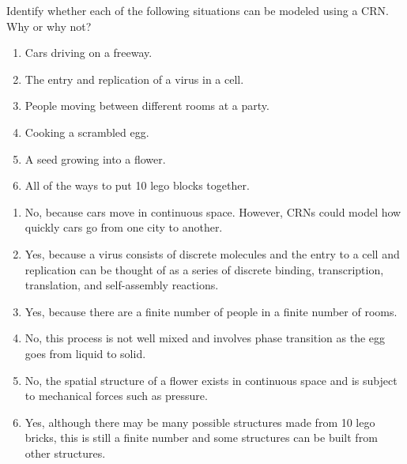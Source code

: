 \begin{popquiz}[label=pq:crn:modelling]
  Identify whether each of the following situations can be modeled using a CRN. Why or why not?
  \begin{enumerate}
    \item Cars driving on a freeway. 
    \item The entry and replication of a virus in a cell.
    \item People moving between different rooms at a party.
    \item Cooking a scrambled egg. 
    \item A seed growing into a flower. 
    \item All of the ways to put 10 lego blocks together. 
  \end{enumerate}
\solution
  \begin{enumerate}
    \item No, because cars move in continuous space. However, CRNs could model how quickly cars go from one city to another.
    \item Yes, because a virus consists of discrete molecules and the entry to a cell and replication can be thought of as a series of discrete binding, transcription, translation, and self-assembly reactions.
    \item Yes, because there are a finite number of people in a finite number of rooms.
    \item No, this process is not well mixed and involves phase transition as the egg goes from liquid to solid.
    \item No, the spatial structure of a flower exists in continuous space and is subject to mechanical forces such as pressure.
    \item Yes, although there may be many possible structures made from 10 lego bricks, this is still a finite number and some  structures can be built from other structures.
  \end{enumerate}
\end{popquiz}

